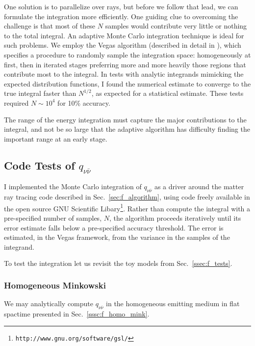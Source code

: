 One solution is to parallelize over rays, but before we follow that lead, we
can formulate the integration more efficiently.
One guiding clue to overcoming the challenge is that most of these $N$
samples would contribute very little or nothing to the total integral.
An adaptive Monte Carlo integration technique is ideal for such problems.
We employ the Vegas algorithm
(described in detail in \citealt[Sec.~7.9]{pres2007-nr_3rd_ed}),
which specifies a procedure to randomly sample the integration space:
homogeneously at first, then in iterated stages preferring more and more
heavily those regions that contribute most to the integral.
In tests with analytic integrands mimicking the expected distribution functions,
I found the numerical estimate to converge to the true integral faster than
$N^{1/2}$, as expected for a statistical estimate. These tests required
$N\sim10^4$ for 10\% accuracy.

The range of the energy integration must capture the major contributions to the
integral, and not be so large that the adaptive algorithm has difficulty
finding the important range at an early stage.

\subsection{Code Tests of $q_{\nu\bar{\nu}}$}
\label{ssec:q_tests}
I implemented the Monte Carlo integration of $q_{\nu\bar{\nu}}$ as a driver
around the matter ray tracing code described in Sec.~\ref{sec:f_algorithm},
using code freely available in the open source GNU Scientific
Libary\footnote{\nolinkurl{http://www.gnu.org/software/gsl/}}.
Rather than compute the integral with a pre-specified number of samples, $N$,
the algorithm proceeds iteratively until its error estimate falls below
a pre-specified accuracy threshold.
The error is estimated, in the Vegas framework, from the variance in the
samples of the integrand. 

To test the integration let us revisit the toy models from
Sec.~\ref{ssec:f_tests}.

\subsubsection{Homogeneous Minkowski}
\label{sssc:q_homo_mink}
We may analytically compute $q_{\nu\bar{\nu}}$ in the homogeneous emitting
medium in flat spactime presented in Sec.~\ref{sssc:f_homo_mink}.


